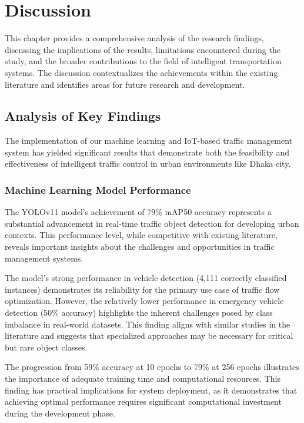 \chapter{Discussion}
\label{ch:discussion}

This chapter provides a comprehensive analysis of the research findings, discussing the implications of the results, limitations encountered during the study, and the broader contributions to the field of intelligent transportation systems. The discussion contextualizes the achievements within the existing literature and identifies areas for future research and development.

\section{Analysis of Key Findings}
\label{sec:key_findings_analysis}

The implementation of our machine learning and IoT-based traffic management system has yielded significant results that demonstrate both the feasibility and effectiveness of intelligent traffic control in urban environments like Dhaka city.

\subsection{Machine Learning Model Performance}
The YOLOv11 model's achievement of 79\% mAP50 accuracy represents a substantial advancement in real-time traffic object detection for developing urban contexts. This performance level, while competitive with existing literature, reveals important insights about the challenges and opportunities in traffic management systems.

The model's strong performance in vehicle detection (4,111 correctly classified instances) demonstrates its reliability for the primary use case of traffic flow optimization. However, the relatively lower performance in emergency vehicle detection (50\% accuracy) highlights the inherent challenges posed by class imbalance in real-world datasets. This finding aligns with similar studies in the literature and suggests that specialized approaches may be necessary for critical but rare object classes.

The progression from 59\% accuracy at 10 epochs to 79\% at 256 epochs illustrates the importance of adequate training time and computational resources. This finding has practical implications for system deployment, as it demonstrates that achieving optimal performance requires significant computational investment during the development phase.


